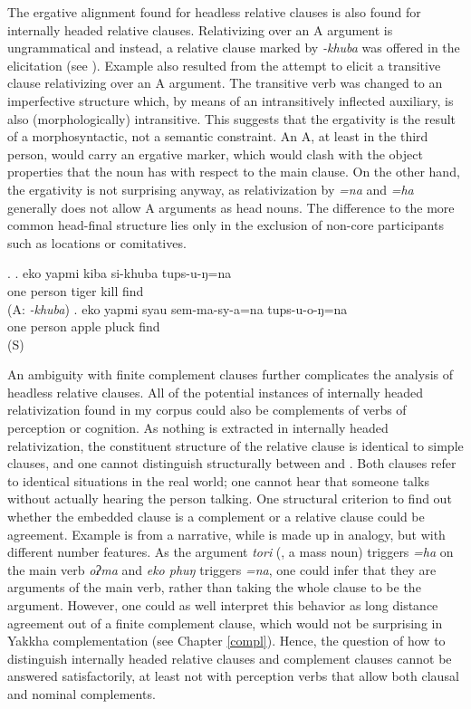 The ergative alignment found for headless relative clauses is also found for internally headed relative clauses. Relativizing over an A argument is ungrammatical and instead, a relative clause marked by \emph{-khuba} was offered in the elicitation (see \Next[a]). Example \Next[b] also resulted from the attempt to elicit a transitive clause relativizing over an A argument. The transitive verb was changed to an imperfective structure which, by means of an intransitively inflected auxiliary, is also  (morphologically) intransitive. This suggests that the ergativity is the result of a  morphosyntactic, not a semantic constraint. An  A, at least in the third person, would carry an ergative marker, which would clash with the object properties that the noun has with respect to the main clause. On the other hand, the ergativity is not surprising anyway, as relativization by \emph{=na} and \emph{=ha} generally does not allow A arguments as head nouns. The difference to the more common head-final structure lies only in the exclusion  of non-core participants such as locations or comitatives.


\ex. \ag. eko  yapmi kiba si-khuba tups-u-ŋ=na\\
one person tiger kill find\\
 (A: \emph{-khuba})
\bg. eko yapmi syau sem-ma-sy-a=na tups-u-o-ŋ=na\\
one person apple pluck find\\
 (S)


An ambiguity with finite complement clauses further complicates the analysis of headless relative clauses. All of the potential instances of internally headed relativization found in my corpus could also be complements of  verbs of perception or cognition. As nothing is extracted in internally headed relativization, the constituent structure of the relative clause is identical to simple clauses, and one cannot distinguish structurally between  and . Both clauses refer to identical situations in the real world; one cannot hear that someone talks without actually hearing the person talking. One structural criterion to find out whether the embedded clause is a complement or a relative clause could be agreement. Example \Next[a] is from a narrative, while \Next[b] is made up in analogy, but with different number features. As the argument \emph{tori} (, a mass noun) triggers \emph{=ha}  on the main verb \emph{oʔma}  and \emph{eko phuŋ}  triggers \emph{=na}, one could infer that they are arguments of the main verb, rather than taking the whole clause to be the argument. However, one could as well interpret this behavior as long distance agreement out of a finite complement clause, which would not be surprising in Yakkha complementation (see Chapter \ref{compl}). Hence, the question of how to distinguish internally headed relative clauses and complement clauses cannot be answered satisfactorily, at least not with perception verbs that allow both clausal and nominal complements. 

